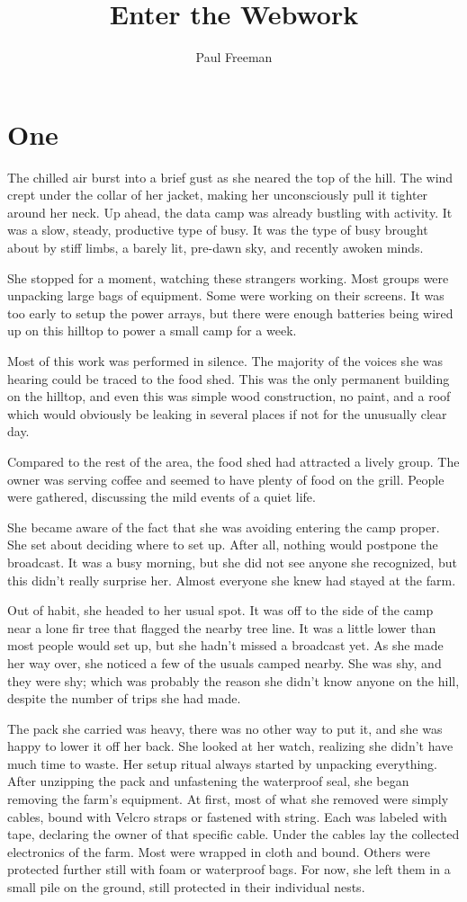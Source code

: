 \documentclass[12pt,novel,nonsubmission,smart]{sffms}
\author{Paul Freeman}
\title{Enter the Webwork}
\begin{document}
\chapter{One}
The chilled air burst into a brief gust as she neared the top of
the hill. The wind crept under the collar of her jacket, making
her unconsciously pull it tighter around her neck. Up ahead, the
data camp was already bustling with activity. It was a slow,
steady, productive type of busy. It was the type of busy brought
about by stiff limbs, a barely lit, pre-dawn sky, and recently
awoken minds.

She stopped for a moment, watching these strangers working. Most
groups were unpacking large bags of equipment. Some were working
on their screens. It was too early to setup the power arrays,
but there were enough batteries being wired up on this hilltop
to power a small camp for a week.

Most of this work was performed in silence. The majority of the
voices she was hearing could be traced to the food shed. This
was the only permanent building on the hilltop, and even this
was simple wood construction, no paint, and a roof which would
obviously be leaking in several places if not for the unusually
clear day.

Compared to the rest of the area, the food shed had attracted a
lively group. The owner was serving coffee and seemed to have
plenty of food on the grill. People were gathered, discussing
the mild events of a quiet life.

She became aware of the fact that she was avoiding entering the
camp proper. She set about deciding where to set up. After all,
nothing would postpone the broadcast. It was a busy morning, but
she did not see anyone she recognized, but this didn't really
surprise her. Almost everyone she knew had stayed at the farm.

Out of habit, she headed to her usual spot. It was off to the
side of the camp near a lone fir tree that flagged the nearby
tree line. It was a little lower than most people would set up,
but she hadn't missed a broadcast yet. As she made her way over,
she noticed a few of the usuals camped nearby. She was shy, and
they were shy; which was probably the reason she didn't know
anyone on the hill, despite the number of trips she had made.

The pack she carried was heavy, there was no other way to put
it, and she was happy to lower it off her back. She looked at
her watch, realizing she didn't have much time to waste. Her
setup ritual always started by unpacking everything. After
unzipping the pack and unfastening the waterproof seal, she
began removing the farm's equipment. At first, most of what she
removed were simply cables, bound with Velcro straps or fastened
with string. Each was labeled with tape, declaring the owner of
that specific cable. Under the cables lay the collected
electronics of the farm. Most were wrapped in cloth and bound.
Others were protected further still with foam or waterproof
bags. For now, she left them in a small pile on the ground,
still protected in their individual nests.
\end{document}
